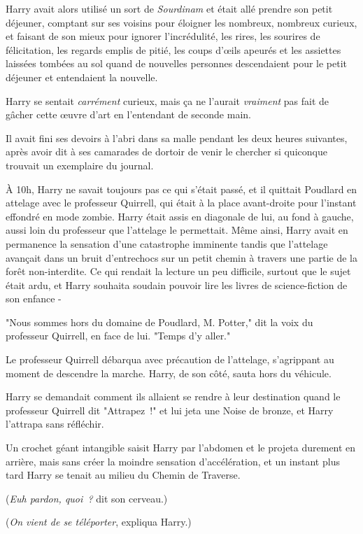 Harry avait alors utilisé un sort de \emph{Sourdinam} et était allé prendre son petit déjeuner, comptant sur ses voisins pour éloigner les nombreux, nombreux curieux, et faisant de son mieux pour ignorer l'incrédulité, les rires, les sourires de félicitation, les regards emplis de pitié, les coups d'œils apeurés et les assiettes laissées tombées au sol quand de nouvelles personnes descendaient pour le petit déjeuner et entendaient la nouvelle.

Harry se sentait \emph{carrément} curieux, mais ça ne l'aurait \emph{vraiment} pas fait de gâcher cette œuvre d'art en l'entendant de seconde main.

Il avait fini ses devoirs à l'abri dans sa malle pendant les deux heures suivantes, après avoir dit à ses camarades de dortoir de venir le chercher si quiconque trouvait un exemplaire du journal.

À 10h, Harry ne savait toujours pas ce qui s'était passé, et il quittait Poudlard en attelage avec le professeur Quirrell, qui était à la place avant-droite pour l'instant effondré en mode zombie. Harry était assis en diagonale de lui, au fond à gauche, aussi loin du professeur que l'attelage le permettait. Même ainsi, Harry avait en permanence la sensation d'une catastrophe imminente tandis que l'attelage avançait dans un bruit d'entrechocs sur un petit chemin à travers une partie de la forêt non-interdite. Ce qui rendait la lecture un peu difficile, surtout que le sujet était ardu, et Harry souhaita soudain pouvoir lire les livres de science-fiction de son enfance -

"Nous sommes hors du domaine de Poudlard, M. Potter," dit la voix du professeur Quirrell, en face de lui. "Temps d'y aller."

Le professeur Quirrell débarqua avec précaution de l'attelage, s'agrippant au moment de descendre la marche. Harry, de son côté, sauta hors du véhicule.

Harry se demandait comment ils allaient se rendre à leur destination quand le professeur Quirrell dit "Attrapez~!" et lui jeta une Noise de bronze, et Harry l'attrapa sans réfléchir.

Un crochet géant intangible saisit Harry par l'abdomen et le projeta durement en arrière, mais sans créer la moindre sensation d'accélération, et un instant plus tard Harry se tenait au milieu du Chemin de Traverse.

(\emph{Euh pardon, quoi~?} dit son cerveau.)

(\emph{On vient de se téléporter}, expliqua Harry.)

